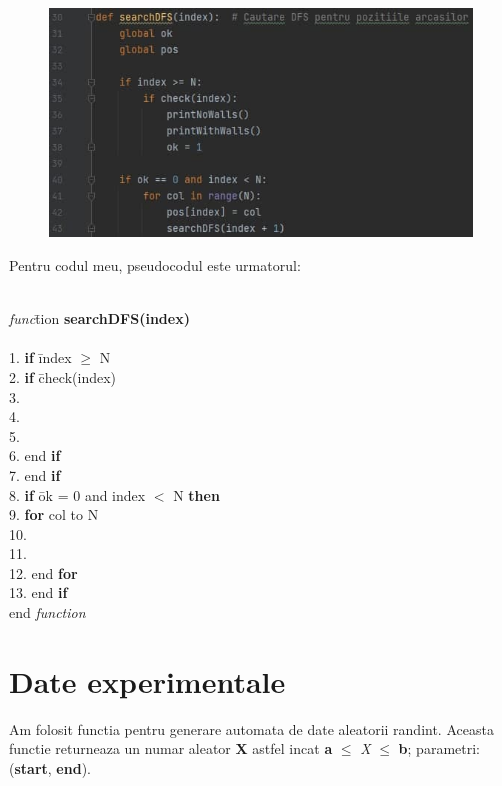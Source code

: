 \documentclass{article}
\begin{document}
\begin{figure}[htbp!]
\centering
\includegraphics[scale=0.5]{dfs}
\end{figure}

Pentru codul meu, pseudocodul este urmatorul: \\\\

\begin{tabbing} 
\indent\textit{func}\={tion}
\textbf{searchDFS(index)} \\\\
1. \indent\>\textbf{if}  \= index  $\geq$ N \\
2. \indent\>\>\textbf{if}  \= check(index) \\
3. \indent\>\> \\
4. \indent\>\>\\
5. \indent\>\>\\
6. \indent\>\>end \textbf{if}\\
7. \indent\>end \textbf{if}\\
8. \indent\>\textbf{if}  \= ok = 0 and index $<$ N \textbf{then} \\
9. \indent\>\>\textbf{for}  col to N \\
10. \indent\>\> \\
11. \indent\>\> \\
12. \indent\>\>end \textbf{for}  \\
13. \indent\>end \textbf{if}  \\
\indent end \textit{function}
\end{tabbing}

\section{Date experimentale}
\vspace{1cm} 
\hspace{1cm}  Am folosit functia pentru generare automata de date aleatorii randint. Aceasta functie returneaza un numar aleator \textbf{X} astfel incat \textbf{a} $\leq$ \textit{X} $\leq$ \textbf{b}; parametri: (\textbf{start}, \textbf{end}).\\
\end{document}
